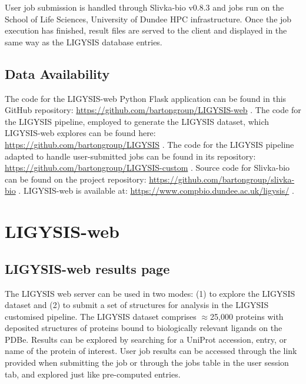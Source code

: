 

User job submission is handled through Slivka-bio v0.8.3 \cite{WAROWNY_2021_SLIVKA, SLIVKA_BIO} and jobs run on the School of Life Sciences, University of Dundee HPC infrastructure. Once the job execution has finished, result files are served to the client and displayed in the same way as the LIGYSIS database entries.

\subsection{Data Availability}

The code for the LIGYSIS-web Python Flask application can be found in this GitHub repository: \url{https://github.com/bartongroup/LIGYSIS-web} \cite{UTGES_2024_LIGYSIS_WEB_ZENODO}. The code for the LIGYSIS pipeline, employed to generate the LIGYSIS dataset, which LIGYSIS-web explores can be found here: \url{https://github.com/bartongroup/LIGYSIS} \cite{UTGES_2024_LIGYSIS_ZENODO}. The code for the LIGYSIS pipeline adapted to handle user-submitted jobs can be found in its repository: \url{https://github.com/bartongroup/LIGYSIS-custom} \cite{UTGES_2024_LIGYSIS_CUSTOM_ZENODO}. Source code for Slivka-bio can be found on the project repository:  \url{https://github.com/bartongroup/slivka-bio} \cite{MACGOWAN_2020_DRSASP}. LIGYSIS-web is available at: \url{https://www.compbio.dundee.ac.uk/ligysis/} \cite{LIGYSIS_SERVER}.

\section{LIGYSIS-web}

\subsection{LIGYSIS-web results page}

The LIGYSIS web server can be used in two modes: (1) to explore the LIGYSIS dataset and (2) to submit a set of structures for analysis in the LIGYSIS customised pipeline. The LIGYSIS dataset comprises $\approx$25,000 proteins with deposited structures of proteins bound to biologically relevant ligands on the PDBe. Results can be explored by searching for a UniProt accession, entry, or name of the protein of interest. User job results can be accessed through the link provided when submitting the job or through the jobs table in the user session tab, and explored just like pre-computed entries.

